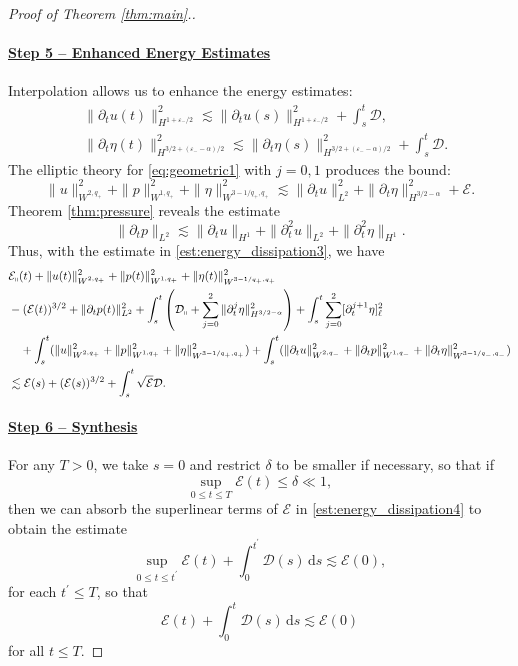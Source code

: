 \documentclass[letterpaper,reqno,10pt,twoside]{amsart}
\theoremstyle{definition}
\theoremstyle{remark}
\def\p{\partial}
\begin{document}
\begin{proof}[Proof of Theorem \ref{thm:main}.]
			\paragraph{\underline{Step 5 -- Enhanced Energy Estimates}}
			Interpolation allows us to enhance the energy estimates:
			\[
			\begin{aligned}
				&\|\p_tu(t)\|_{H^{1+\varepsilon_-/2}}^2\lesssim\|\p_tu(s)\|_{H^{1+\varepsilon_-/2}}^2+\int_s^t\mathcal{D},\\
				&\|\p_t\eta(t)\|_{H^{3/2+(\varepsilon_--\alpha)/2}}^2\lesssim\|\p_t\eta(s)\|_{H^{3/2+(\varepsilon_--\alpha)/2 }}^2+\int_s^t\mathcal{D}.
			\end{aligned}
			\]
			The elliptic theory for \eqref{eq:geometric1} with $j=0,1$ produces the bound:
			\[
			\|u\|_{W^{2,q_+}}^2+\|p\|_{W^{1,q_+}}^2+\|\eta\|_{W^{3-1/q_+,q_+}}^2
			\lesssim \|\p_tu\|_{L^2}^2+\|\p_t\eta\|_{H^{3/2-\alpha}}^2+\mathcal{E}.
			\]
			Theorem \ref{thm:pressure} reveals the estimate
			\[
			\|\p_tp\|_{L^2}\lesssim \|\p_tu\|_{H^1}+\|\p_t^2u\|_{L^2}+\|\p_t^{2}\eta\|_{H^1}.
			\]
			Thus, with the estimate in \eqref{est:energy_dissipation3}, we have
			\begin{equation}\label{est:energy_dissipation4}
				\begin{aligned}
					&\mathcal{E}_\shortparallel(t)+\|u(t)\|_{W^{2,q_+}}^2+\|p(t)\|_{W^{1,q_+}}^2+\|\eta(t)\|_{W^{3-1/q_+,q_+}}^2\\
					&-(\mathcal{E}(t))^{3/2}+\|\p_tp(t)\|_{L^2}^2+\int_s^t\left(\mathcal{D}_\shortparallel+\sum_{j=0}^2\|\p_t^{j}\eta\|_{H^{3/2-\alpha}}^2\right)+\int_s^t\sum_{j=0}^2[\p_t^{j+1}\eta]_\ell^2\\
					&\quad+\int_s^t(\|u\|_{W^{2,q_+}}^2+\|p\|_{W^{1,q_+}}^2+\|\eta\|_{W^{3-1/q_+,q_+}}^2)+\int_s^t(\|\p_tu\|_{W^{2,q_-}}^2+\|\p_tp\|_{W^{1,q_-}}^2+\|\p_t\eta\|_{W^{3-1/q_-,q_-}}^2)\\
					&\lesssim\mathcal{E}(s)+(\mathcal{E}(s))^{3/2}+\int_s^t\sqrt{\mathcal{E}}\mathcal{D}.
				\end{aligned}
			\end{equation}
			
			\paragraph{\underline{Step 6 -- Synthesis}}
			For any $T>0$, we take $s=0$ and restrict $\delta$ to be smaller if necessary, so that if
			\[
			\sup_{0\le t\le T}\mathcal{E}(t)\le\delta \ll 1,
			\]
			then we can absorb the superlinear terms of $\mathcal{E}$ in \eqref{est:energy_dissipation4} to obtain the estimate
			\[
			\sup_{0\le t\le t^\prime}\mathcal{E}(t)+\int_0^{t^\prime}\mathcal{D}(s)\,\mathrm{d}s\lesssim \mathcal{E}(0),
			\]
			for each $t^\prime\le T$, so that
			\begin{equation}\label{est:energy5}
				\mathcal{E}(t)+\int_0^t\mathcal{D}(s)\,\mathrm{d}s\lesssim \mathcal{E}(0)
			\end{equation}
			for all $t\le T$.
			

\end{proof}
\end{document}
